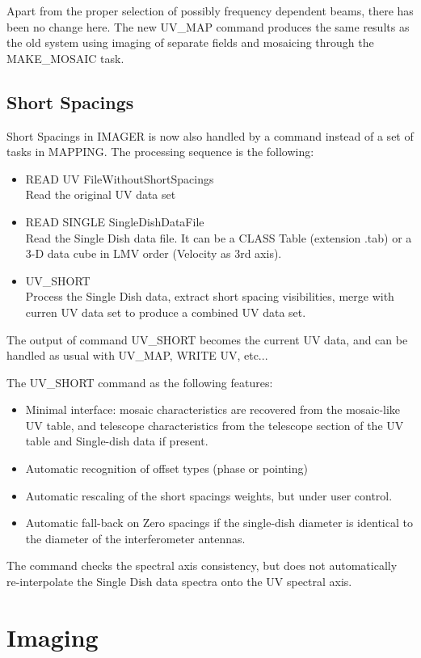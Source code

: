 \documentclass[11pt]{article}
\begin{document}
Apart from the proper selection of possibly frequency dependent beams, there has been no
change here. The new UV\_MAP command produces the same results as the old system using imaging
of separate fields and mosaicing through the MAKE\_MOSAIC task.

\subsection{Short Spacings}

Short Spacings in IMAGER is now also handled by a command instead 
of a set of tasks in MAPPING.  The processing sequence is the following:
\begin{itemize}\itemsep 0pt
\item READ UV  FileWithoutShortSpacings\\
Read the original UV data set
\item READ SINGLE  SingleDishDataFile \\
Read the Single Dish data file. It can be a CLASS Table (extension .tab)
or a 3-D data cube in LMV order (Velocity as 3rd axis). 
\item UV\_SHORT\\
Process the Single Dish data, extract short spacing visibilities,
merge with curren UV data set to produce a combined UV data set.
\end{itemize}
The output of command UV\_SHORT becomes the current UV data, and can
be handled as usual with UV\_MAP, WRITE UV, etc...

The UV\_SHORT command as the following features:
\begin{itemize}\itemsep 0pt
\item Minimal interface: mosaic characteristics are recovered
from the mosaic-like UV table, and telescope characteristics from the telescope section
of the UV table and Single-dish data if present.
\item Automatic recognition of offset types (phase or pointing)
\item Automatic rescaling of the short spacings weights, but under user control.
\item Automatic fall-back on Zero spacings if the single-dish diameter
is identical to the diameter of the interferometer antennas.
\end{itemize}
The command checks the spectral axis consistency, but does not automatically
re-interpolate the Single Dish data spectra onto the UV spectral axis.

\section{Imaging}
\end{document}
